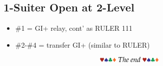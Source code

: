 \documentclass{article}
\begin{document}
\begin{multicols}{2}
\begin{CJK*}{UTF8}{gt}
\subsection{1-Suiter Open at 2-Level}\label{sec:1suit}
\begin{itemize}
    \item \#1 = GI+ relay, cont' as RULER 111
    \item \#2-\#4 = transfer GI+ (similar to RULER)
\end{itemize}

$$\hhh\sss\ccc\ddd~The~end~\hhh\sss\ccc\ddd$$

\end{CJK*}
\end{multicols}
\end{document}
